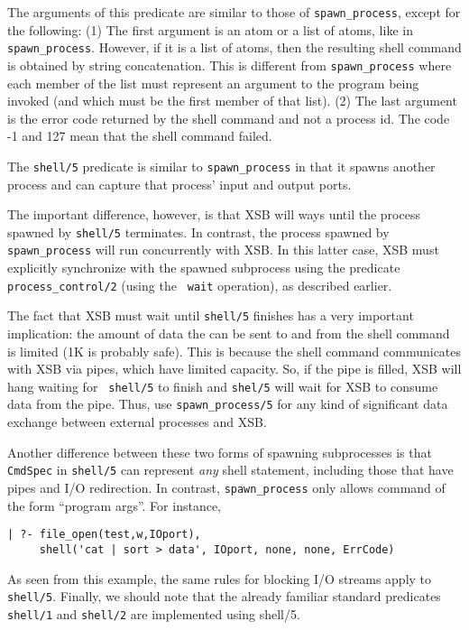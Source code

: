 \begin{description}
    The arguments of this predicate are similar to those of
    \verb|spawn_process|, except for the following:
    (1) The first argument is an atom or a list of atoms, like in
    \verb|spawn_process|. However, if it is a list of atoms, then the
    resulting shell command is obtained by string concatenation. This is
    different from \verb|spawn_process| where each member of the list must
    represent an argument to the program being invoked (and which must be
    the first member of that list).  (2) The last argument is the error
    code returned by the shell command and not a process id. The code -1
    and 127 mean that the shell command failed.
    
    The {\tt shell/5} predicate is similar to \verb|spawn_process| in that
    it spawns another process and can capture that process' input and
    output ports.
    
    The important difference, however, is that XSB will ways until the
    process spawned by {\tt shell/5} terminates. In contrast, the process
    spawned by \verb|spawn_process| will run concurrently with XSB.  In
    this latter case, XSB must explicitly synchronize with the spawned
    subprocess using the predicate \verb|process_control/2| (using the {\tt
      wait} operation), as described earlier.
    
    The fact that XSB must wait until {\tt shell/5} finishes has a very
    important implication: the amount of data the can be sent to and from
    the shell command is limited (1K is probably safe). This is because the
    shell command communicates with XSB via pipes, which have limited
    capacity.  So, if the pipe is filled, XSB will hang waiting for {\tt
      shell/5} to finish and {\tt shel/5} will wait for XSB to consume data
    from the pipe.  Thus, use \verb|spawn_process/5| for any kind of
    significant data exchange between external processes and XSB.
  
  Another difference between these two forms of spawning subprocesses is
  that {\tt CmdSpec} in {\tt shell/5} can represent \emph{any} shell
  statement, including those that have pipes and I/O redirection. In
  contrast, \verb|spawn_process| only allows command of the form ``program
  args''. For instance,
\begin{verbatim}
| ?- file_open(test,w,IOport),
     shell('cat | sort > data', IOport, none, none, ErrCode)
\end{verbatim}
As seen from this example, the same rules for blocking I/O streams
apply to {\tt shell/5}. Finally, we should note that the already familiar
standard predicates {\tt shell/1} and {\tt shell/2} are implemented using
shell/5.


\end{description}
